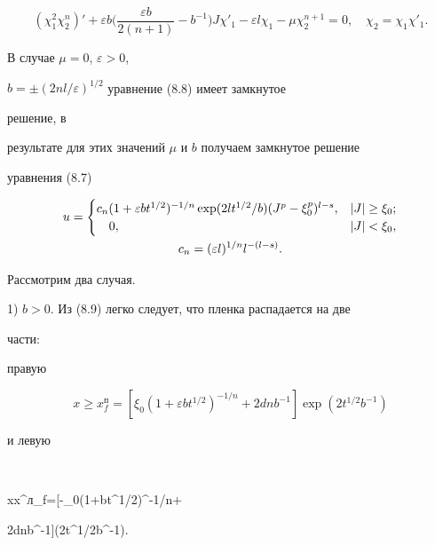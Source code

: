 \begin{equation}


(\chi^2_1\chi^n_2)'+\varepsilon b


\biggl(\frac{\varepsilon b}{2(n+1)}-b^{-1}\biggr) J\chi'_1-


\varepsilon l\chi_1-\mu\chi^{n+1}_2=0,\quad


\chi_2=\chi_1\chi'_1.


\end{equation}


В случае $\mu=0$, $\varepsilon>0$,


$b=\pm(2nl/\varepsilon)^{1/2}$ уравнение (8.8) имеет замкнутое


решение, в


результате для этих значений $\mu$ и $b$ получаем замкнутое решение


уравнения (8.7)


\begin{gather}


u=


\begin{cases}


c_n(1+\varepsilon bt^{1/2})^{-1/n}\exp(2lt^{1/2}/b)


(J^p-\xi^p_0)^{l-s}, & |J|\ge \xi_0;\\


\quad 0, & |J|<\xi_0,


\end{cases}


\\


c_n=(\varepsilon l)^{1/n}l^{-(l-s)}.\notag


\end{gather}


Рассмотрим два случая.





1) $b>0$. Из (8.9) легко следует, что пленка распадается на две


части:


правую


$$


x\ge x^п_f=[\xi_0(1+\varepsilon bt^{1/2})^{-1/n}+


2dnb^{-1}]\exp(2t^{1/2}b^{-1})


$$


и левую


$$


x\le x^л_f=[-\xi_0(1+\varepsilon bt^{1/2})^{-1/n}+


2dnb^{-1}]\exp(2t^{1/2}b^{-1}).


